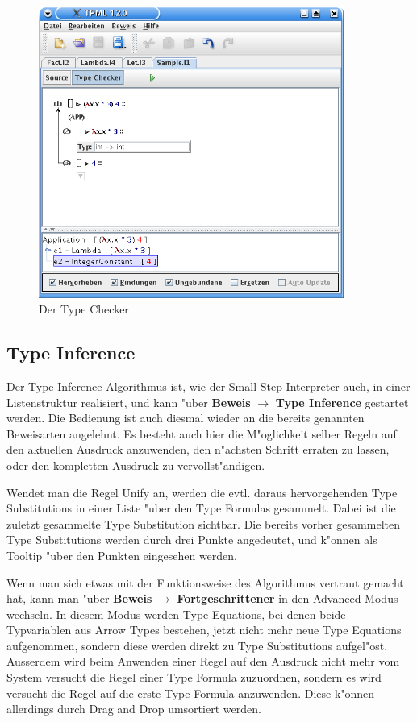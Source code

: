 \begin{figure}[h]
\begin{center}
\includegraphics[width=10cm]{images/type-checker.png}
\caption{Der Type Checker}
\label{FigureTypeChecker}
\end{center}
\end{figure}

\subsection{Type Inference}
Der Type Inference Algorithmus ist, wie der Small Step Interpreter 
auch, in einer Listenstruktur realisiert, und kann "uber {\bf Beweis} 
$\rightarrow$ {\bf Type Inference} gestartet werden. Die Bedienung ist auch diesmal 
wieder an die bereits genannten Beweisarten angelehnt. Es besteht 
auch hier die M"oglichkeit selber Regeln auf den aktuellen Ausdruck
anzuwenden, den n"achsten Schritt erraten zu lassen, oder den kompletten
Ausdruck zu vervollst"andigen.

Wendet man die Regel Unify an, werden die evtl. daraus hervorgehenden
Type Substitutions in einer Liste "uber den Type Formulas gesammelt. 
Dabei ist die zuletzt gesammelte Type Substitution sichtbar. Die bereits
vorher gesammelten Type Substitutions werden durch drei Punkte angedeutet,
und k"onnen als Tooltip "uber den Punkten eingesehen werden.

Wenn man sich etwas mit der Funktionsweise des Algorithmus vertraut gemacht hat,
kann man "uber {\bf Beweis} $\rightarrow$ {\bf Fortgeschrittener} in den 
Advanced Modus wechseln. In diesem Modus werden Type Equations, bei denen beide
Typvariablen aus Arrow Types bestehen, jetzt nicht mehr neue Type Equations
aufgenommen, sondern diese werden direkt zu Type Substitutions aufgel"ost.
Ausserdem wird beim Anwenden einer Regel auf den Ausdruck nicht mehr vom System
versucht die Regel einer Type Formula zuzuordnen, sondern es wird versucht die Regel
auf die erste Type Formula anzuwenden. Diese k"onnen allerdings durch Drag 
and Drop umsortiert werden.

